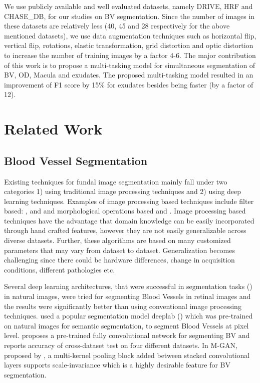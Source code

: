 \documentclass[utf8]{FrontiersinHarvard} %
\begin{document}
We use publicly available and well evaluated datasets, namely DRIVE, HRF and CHASE\_DB, for our studies on BV segmentation. Since the number of images in these datasets are relatively less (40, 45 and 28 respectively for the above mentioned datasets), we use data augmentation techniques such as horizontal flip, vertical flip, rotations, elastic transformation, grid distortion and optic distortion to increase the number of training images by a factor 4-6. The major contribution of this work is to propose a multi-tasking model for simultaneous segmentation of BV, OD, Macula and exudates. The proposed multi-tasking model resulted in an improvement of F1 score by 15\% for exudates besides being faster (by a factor of 12).

\section{Related Work}
\subsection{Blood Vessel Segmentation}
Existing  techniques for fundal image segmentation mainly fall under two categories 1) using traditional image processing techniques and 2) using deep learning techniques. Examples of image processing based techniques include filter based: \cite{zhang2010retinal}, \cite{yavuz2011retinal} and \cite{aslan2018segmentation} and morphological operations based \cite{hassan2015retinal} and \cite{singh2014new}. Image processing based techniques have the advantage that domain knowledge can be easily incorporated through hand crafted features, however they are not easily generalizable across diverse datasets. Further, these algorithms are based on many customized parameters that may vary from dataset to dataset. Generalization becomes challenging since there could be hardware differences, change in acquisition conditions, different pathologies etc.

Several deep learning architectures, that were successful in segmentation tasks (\cite{chen2017deeplab}) in natural images, were tried for segmenting Blood Vessels in retinal images and the results were significantly better than using conventional image processing techniques. \cite{vengalil2016customizing} used a popular segmentation model deeplab (\cite{chen2017deeplab}) which was pre-trained on natural images  for semantic segmentation,   to segment Blood Vessels at pixel level. \cite {jiang2018retinal} proposes a  pre-trained fully convolutional network for segmenting BV and reports accuracy of cross-dataset test on four different datasets. In M-GAN, proposed by \cite{park2020m}, a multi-kernel pooling block added between stacked convolutional layers supports scale-invariance which is a highly desirable feature for BV segmentation.
\end{document}
